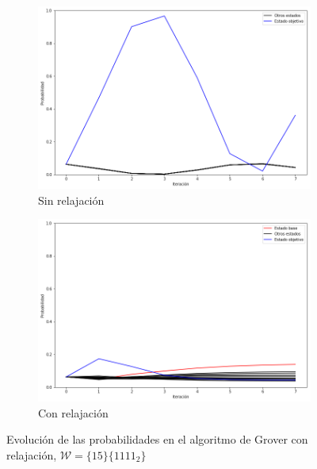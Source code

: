 \begin{figure}[H]
    \centering
    \begin{subfigure}[m]{0.49\textwidth}
        \centering
        \includegraphics[width=0.99\linewidth]{img/groveralllossless.png}
        \caption{Sin relajación}
    \end{subfigure}
    \begin{subfigure}[m]{0.49\textwidth}
        \centering
        \includegraphics[width=0.99\linewidth]{img/groverallloss.png}
        \caption{Con relajación}
    \end{subfigure}
    \caption[Evolución de las probabilidades en el algoritmo de Grover con relajación, $\mathcal{W} = \{15\}$]{Evolución de las probabilidades en el algoritmo de Grover con relajación, $\mathcal{W} = \{15\} \{1111_2\}$}
    \label{fig:groverlosscomp}
\end{figure}

